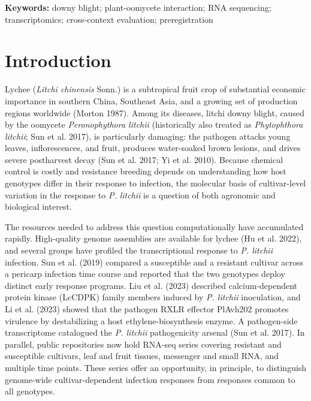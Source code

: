 \documentclass[12pt,letterpaper]{article}
\begin{document}
\noindent\textbf{Keywords:} downy blight; plant-oomycete interaction; RNA sequencing; transcriptomics; cross-context evaluation; preregistration

\section*{Introduction}

Lychee (\textit{Litchi chinensis} Sonn.) is a subtropical fruit crop of substantial economic importance in southern China, Southeast Asia, and a growing set of production regions worldwide (Morton 1987). Among its diseases, litchi downy blight, caused by the oomycete \textit{Peronophythora litchii} (historically also treated as \textit{Phytophthora litchii}; Sun et al. 2017), is particularly damaging: the pathogen attacks young leaves, inflorescences, and fruit, produces water-soaked brown lesions, and drives severe postharvest decay (Sun et al. 2017; Yi et al. 2010). Because chemical control is costly and resistance breeding depends on understanding how host genotypes differ in their response to infection, the molecular basis of cultivar-level variation in the response to \textit{P. litchii} is a question of both agronomic and biological interest.

The resources needed to address this question computationally have accumulated rapidly. High-quality genome assemblies are available for lychee (Hu et al. 2022), and several groups have profiled the transcriptional response to \textit{P. litchii} infection. Sun et al. (2019) compared a susceptible and a resistant cultivar across a pericarp infection time course and reported that the two genotypes deploy distinct early response programs. Liu et al. (2023) described calcium-dependent protein kinase (LcCDPK) family members induced by \textit{P. litchii} inoculation, and Li et al. (2023) showed that the pathogen RXLR effector PlAvh202 promotes virulence by destabilizing a host ethylene-biosynthesis enzyme. A pathogen-side transcriptome catalogued the \textit{P. litchii} pathogenicity arsenal (Sun et al. 2017). In parallel, public repositories now hold RNA-seq series covering resistant and susceptible cultivars, leaf and fruit tissues, messenger and small RNA, and multiple time points. These series offer an opportunity, in principle, to distinguish genome-wide cultivar-dependent infection responses from responses common to all genotypes.
\end{document}
